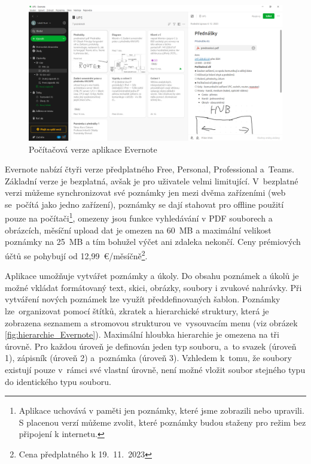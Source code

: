 \documentclass[czech, bc, kiv, he, iso690numb]{fasthesis}
\begin{document}
\begin{figure}[h!]
  \centering
  \includegraphics[width=1\textwidth]{img/BP-Runt/Evernote/Evernote_PC.PNG}
  \caption{Počítačová verze aplikace Evernote}
  \label{fig:evernote_on_pc}
\end{figure}

\newpage

Evernote nabízí čtyři verze předplatného Free, Personal, Professional a~Teams. Základní verze je bezplatná, avšak je pro uživatele velmi limitující. V~bezplatné verzi můžeme synchronizovat své poznámky jen mezi dvěma zařízeními (web se~počítá jako jedno zařízení), poznámky se dají stahovat pro offline použití pouze na počítači\footnote{Aplikace uchovává v paměti jen poznámky, které jsme zobrazili nebo upravili. S placenou verzí můžeme zvolit, které poznámky budou staženy pro režim bez připojení k internetu.}, omezeny jsou funkce vyhledávání v \gls{PDF} souborech a obrázcích, měsíční upload dat je omezen na 60~MB a maximální velikost poznámky na 25~MB a tím bohužel výčet ani zdaleka nekončí. Ceny prémiových účtů se pohybují od 12,99~€/měsíčně\footnote{Cena předplatného k 19.~11.~2023}.

Aplikace umožňuje vytvářet poznámky a úkoly. Do obsahu poznámek a úkolů je možné vkládat formátovaný text, skici, obrázky, soubory i zvukové nahrávky. Při vytváření nových poznámek lze využít předdefinovaných šablon. Poznámky lze~organizovat pomocí štítků, zkratek a hierarchické struktury, která je zobrazena seznamem a stromovou strukturou ve~vysouvacím menu (viz obrázek \ref{fig:hierarchie_Evernote}). Maximální hloubka hierarchie je omezena na tři úrovně. Pro každou úroveň je definován jeden typ souboru, a~to svazek (úroveň 1), zápisník (úroveň 2) a~poznámka (úroveň 3). Vzhledem k~tomu, že soubory existují pouze v~rámci své vlastní úrovně, není možné vložit soubor stejného typu do identického typu souboru.     
\end{document}
